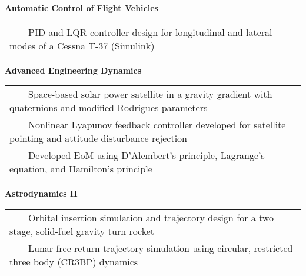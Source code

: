 \documentclass[overlapped, 11pt]{res}
\newcommand{\tabitem}{~~\textbullet~~}
\begin{document}
\begin{resume}
\begin{itemize}
                
            \textbf{Automatic Control of Flight Vehicles}\\
                \begin{tabular}{l}
                    \tabitem PID and LQR controller design for longitudinal and lateral modes of a Cessna T-37 (Simulink)\\
                \end{tabular}
                
            \textbf{Advanced Engineering Dynamics}\\
                \begin{tabular}{l}
                    \tabitem Space-based solar power satellite in a gravity gradient with quaternions and modified Rodrigues parameters\\
                    \tabitem Nonlinear Lyapunov feedback controller developed for satellite pointing and attitude disturbance rejection\\
                    \tabitem Developed EoM using D'Alembert's principle, Lagrange's equation, and Hamilton's principle\\
                \end{tabular}

                
                
            \textbf{Astrodynamics II} \\
                \begin{tabular}{l}
                    \tabitem Orbital insertion simulation and trajectory design for a two stage, solid-fuel gravity turn rocket\\
                    \tabitem Lunar free return trajectory simulation using circular, restricted three body (CR3BP) dynamics\\
                \end{tabular}
            

\end{itemize}
\end{resume}
\end{document}
